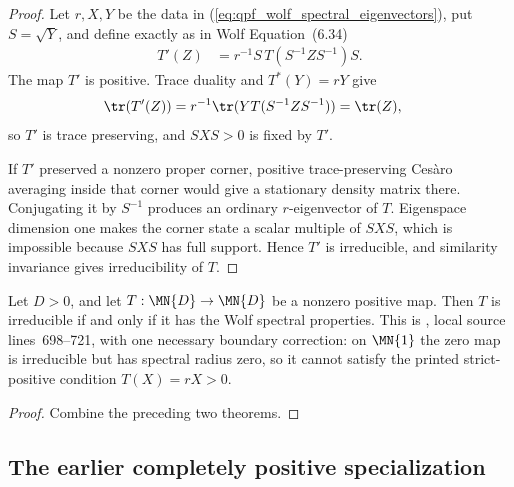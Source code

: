 \begin{proof}
    \leanok
    Let $r,X,Y$ be the data in
    (\ref{eq:qpf_wolf_spectral_eigenvectors}), put $S=\sqrt{Y}$, and define
    exactly as in Wolf Equation~(6.34)
    \begin{align}
        T'(Z)
          &=r^{-1}S\,T(S^{-1}ZS^{-1})S.
        \label{eq:qpf_wolf_spectral_tp_gauge}
    \end{align}
    The map $T'$ is positive.  Trace duality and $T^*(Y)=rY$ give
    \begin{align}
        \tr(T'(Z))
          &=r^{-1}\tr(YT(S^{-1}ZS^{-1}))
           =\tr(Z),
        \notag
    \end{align}
    so $T'$ is trace preserving, and $SXS>0$ is fixed by $T'$.

    If $T'$ preserved a nonzero proper corner, positive trace-preserving
    Ces\`aro averaging inside that corner would give a stationary density
    matrix there.  Conjugating it by $S^{-1}$ produces an ordinary
    $r$-eigenvector of $T$.  Eigenspace dimension one makes the corner state a
    scalar multiple of $SXS$, which is impossible because $SXS$ has full
    support.  Hence $T'$ is irreducible, and similarity invariance gives
    irreducibility of $T$.
\end{proof}

\begin{theorem}
    \label{thm:wolf_theorem_6_4}
    \leanok
    Let $D>0$, and let $T:\MN{D}\to\MN{D}$ be a nonzero positive map.
    Then $T$ is irreducible if and only if it has the Wolf spectral properties.
    This is \cite[Theorem~6.4]{Wolf2012Quantum}, local source lines~698--721,
    with one necessary boundary correction: on $\MN{1}$ the zero map is
    irreducible but has spectral radius zero, so it cannot satisfy the printed
    strict-positive condition $T(X)=rX>0$.
\end{theorem}

\begin{proof}
    \leanok
    Combine the preceding two theorems.
\end{proof}

\subsection{The earlier completely positive specialization}

